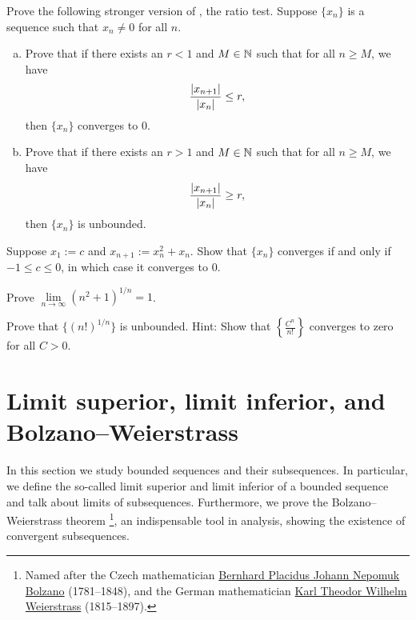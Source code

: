 \begin{samepage}
\begin{exercise}[Easy] \label{exercise:strongerratiotest1}
Prove the following stronger version of , the ratio
test.  
Suppose $\{ x_n \}$ is a sequence such that $x_n \not= 0$ for all
$n$.
\begin{enumerate}[a)]
\item
Prove that if there exists an $r < 1$ and $M \in {\mathbb{N}}$ such that
for all $n \geq M$, we have
\begin{equation*}
\frac{\left\lvert {x_{n+1}} \right\rvert}{\left\lvert {x_n} \right\rvert} \leq r ,
\end{equation*}
then $\{ x_n \}$ converges to $0$.
\item
Prove that if there exists an $r > 1$ and $M \in {\mathbb{N}}$ such that
for all $n \geq M$, we have
\begin{equation*}
\frac{\left\lvert {x_{n+1}} \right\rvert}{\left\lvert {x_n} \right\rvert} \geq r ,
\end{equation*}
then $\{ x_n \}$ is unbounded.
\end{enumerate}
\end{exercise}
\end{samepage}

\begin{exercise} \label{exercise:convergentinitialvalues}
Suppose $x_1 := c$ and $x_{n+1} := x_n^2+x_n$.
Show that $\{ x_n \}$ converges if and only if $-1 \leq c \leq 0$, in which
case it converges to 0.
\end{exercise}

\begin{exercise}
Prove $\lim\limits_{n \to \infty} {(n^2+1)}^{1/n} = 1$.
\end{exercise}

\begin{exercise}
Prove that $\bigl\{ {(n!)}^{1/n} \bigr\}$
is unbounded.
Hint: Show that $\left\{ \frac{C^n}{n!} \right\}$ converges to zero
for all $C > 0$.
\end{exercise}


\sectionnewpage
\section{Limit superior, limit inferior, and Bolzano--Weierstrass}
\label{sec:bw}


In this section we study bounded sequences and their subsequences.
In particular, we define the so-called limit superior and limit inferior
of a bounded sequence and talk about limits of subsequences.
Furthermore, we prove the
Bolzano--Weierstrass theorem%
\footnote{%
Named after the Czech mathematician
\href{https://en.wikipedia.org/wiki/Bernard_Bolzano}{Bernhard Placidus Johann Nepomuk Bolzano}
(1781--1848), and the German mathematician
\href{https://en.wikipedia.org/wiki/Karl_Weierstrass}{Karl Theodor Wilhelm Weierstrass}
(1815--1897).}, an
indispensable tool in analysis, showing the existence of convergent
subsequences.

